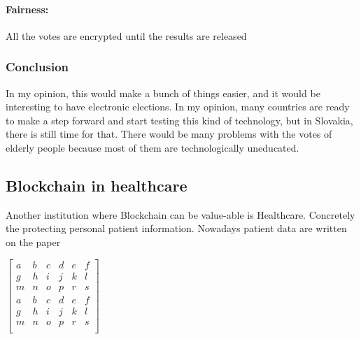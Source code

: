 \documentclass[10pt,english,a4paper]{article}
\begin{document}
\paragraph{Fairness:}
All the votes are encrypted until the results are released
\cite{Alvi:E-voting}



\subsubsection{Conclusion}
In my opinion, this would make a bunch of things easier, and it would be interesting to have electronic elections. In my opinion, many countries are ready to make a step forward and start testing this kind of technology, but in Slovakia, there is still time for that. There would be many problems with the votes of elderly people because most of them are technologically uneducated.

\subsection{Blockchain in healthcare}
Another institution where Blockchain can be value-able is Healthcare. Concretely the protecting personal patient information. Nowadays patient data are written on the paper 
\cite{Ramar:Healthcare}

 
$\begin{bmatrix}
  a & b & c & d & e &f\\
  g & h & i & j & k &l \\
  m & n & o & p & r &s\\
   a & b & c & d & e &f\\
  g & h & i & j & k &l \\
  m & n & o & p & r &s\\
  

  
\end{bmatrix}$



\newpage


\end{document}
